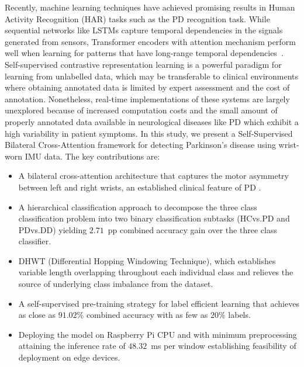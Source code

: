 \documentclass[pmlr]{jmlr}
\begin{document}
Recently, machine learning techniques have achieved promising results in Human Activity Recognition (HAR) tasks such as the PD recognition task. While sequential networks like LSTMs capture temporal dependencies in the signals generated from sensors, Transformer encoders with attention mechanism perform well when learning for patterns that have long-range temporal dependencies~\citep{vaswani2017}. Self-supervised contrastive representation learning is a powerful paradigm for learning from unlabelled data, which may be transferable to clinical environments where obtaining annotated data is limited by expert assessment and the cost of annotation. Nonetheless, real-time implementations of these systems are largely unexplored because of increased computation costs and the small amount of properly annotated data available in neurological diseases like PD which exhibit a high variability in patient symptoms.
In this study, we present a Self-Supervised Bilateral Cross-Attention framework for detecting Parkinson's disease using wrist-worn IMU data. The key contributions are:

\begin{itemize}

\item A bilateral cross-attention architecture that captures the motor asymmetry between left and right wrists, an established clinical feature of PD \@.

\item A hierarchical classification approach to decompose the three class classification problem into two binary classification subtasks (HCvs.PD and PDvs.DD) yielding $2.71$~pp combined accuracy gain over the three class classifier.

\item DHWT (Differential Hopping Windowing Technique), which establishes variable length overlapping throughout each individual class and relieves the source of underlying class imbalance from the dataset.

\item A self-supervised pre-training strategy for label efficient learning that achieves as close as $91.02\%$ combined accuracy with as few as $20\%$ labels.

\item Deploying the model on Raspberry Pi CPU and with minimum preprocessing attaining the inference rate of $48.32$~ms per window establishing feasibility of deployment on edge devices.

\end{itemize}
\end{document}

